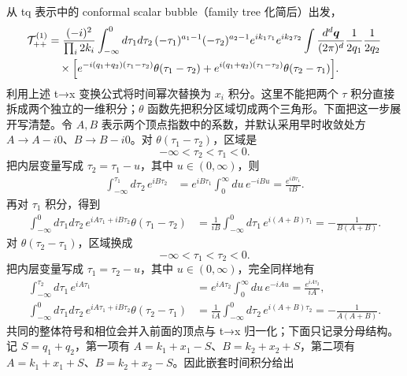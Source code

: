 ﻿\documentclass[a4paper,11pt]{article}
\begin{document}
从 tq 表示中的 conformal scalar bubble（family tree 化简后）出发，
\begin{align}
    \mathcal{T}^{(1)}_{++}&=\frac{(-i)^2}{\prod_i 2k_i}\int_{-\infty}^0 d\tau_1d\tau_2\,(-\tau_1)^{a_1-1}(-\tau_2)^{a_2-1}e^{ik_1\tau_1}e^{ik_2\tau_2}
    \int\frac{d^d\boldsymbol{q}}{(2\pi)^d}\frac{1}{2q_1}\frac{1}{2q_2}\notag\\
    &\quad\times\Bigl[e^{-i(q_1+q_2)(\tau_1-\tau_2)}\theta(\tau_1-\tau_2)+e^{i(q_1+q_2)(\tau_1-\tau_2)}\theta(\tau_2-\tau_1)\Bigr].
\end{align}
利用上述 t→x 变换公式将时间幂次替换为 $x_i$ 积分。这里不能把两个 $\tau$ 积分直接拆成两个独立的一维积分；$\theta$ 函数先把积分区域切成两个三角形。下面把这一步展开写清楚。令 $A,B$ 表示两个顶点指数中的系数，并默认采用早时收敛处方 $A\to A-i0$、$B\to B-i0$。对 $\theta(\tau_1-\tau_2)$，区域是
\begin{equation}
    -\infty<\tau_2<\tau_1<0.
    \label{thetaRegion12}
\end{equation}
把内层变量写成 $\tau_2=\tau_1-u$，其中 $u\in(0,\infty)$，则
\begin{align}
    \int_{-\infty}^{\tau_1}d\tau_2\,e^{iB\tau_2}
    &=e^{iB\tau_1}\int_0^\infty du\,e^{-iBu}
      =\frac{e^{iB\tau_1}}{iB}.
    \label{innerTheta12}
\end{align}
再对 $\tau_1$ 积分，得到
\begin{align}
    \int_{-\infty}^0 d\tau_1d\tau_2\,
      e^{iA\tau_1+iB\tau_2}\theta(\tau_1-\tau_2)
    &=\frac{1}{iB}\int_{-\infty}^0d\tau_1\,e^{i(A+B)\tau_1}
      =-\frac{1}{B(A+B)}.
    \label{thetaIntegral12}
\end{align}
对 $\theta(\tau_2-\tau_1)$，区域换成
\begin{equation}
    -\infty<\tau_1<\tau_2<0.
    \label{thetaRegion21}
\end{equation}
把内层变量写成 $\tau_1=\tau_2-u$，其中 $u\in(0,\infty)$，完全同样地有
\begin{align}
    \int_{-\infty}^{\tau_2}d\tau_1\,e^{iA\tau_1}
    &=e^{iA\tau_2}\int_0^\infty du\,e^{-iAu}
      =\frac{e^{iA\tau_2}}{iA},
    \label{innerTheta21}\\
    \int_{-\infty}^0 d\tau_1d\tau_2\,
      e^{iA\tau_1+iB\tau_2}\theta(\tau_2-\tau_1)
    &=\frac{1}{iA}\int_{-\infty}^0d\tau_2\,e^{i(A+B)\tau_2}
      =-\frac{1}{A(A+B)}.
    \label{thetaIntegral21}
\end{align}
共同的整体符号和相位会并入前面的顶点与 t→x 归一化；下面只记录分母结构。记 $S=q_1+q_2$，第一项有 $A=k_1+x_1-S$、$B=k_2+x_2+S$，第二项有 $A=k_1+x_1+S$、$B=k_2+x_2-S$。因此嵌套时间积分给出
\end{document}

